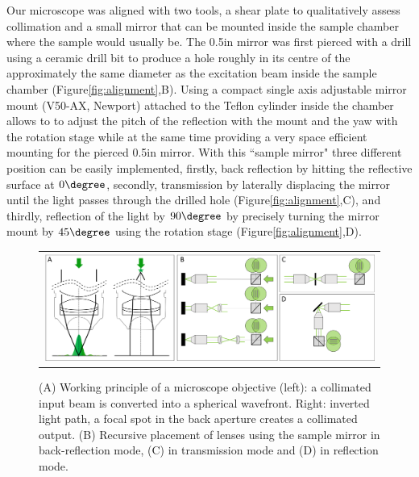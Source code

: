 \documentclass[12pt]{spieman}  %
\begin{document}
Our microscope was aligned with two tools, a shear plate to qualitatively assess collimation and a small mirror that can be mounted inside the sample chamber where the sample would usually be. The 0.5in mirror was first pierced with a drill using a ceramic drill bit to produce a hole roughly in its centre of the approximately the same diameter as the excitation beam inside the sample chamber (Figure\ref{fig:alignment},B). Using a compact single axis adjustable mirror mount (V50-AX, Newport) attached to the Teflon cylinder inside the chamber allows to to adjust the pitch of the reflection with the mount and the yaw with the rotation stage while at the same time providing a very space efficient mounting for the pierced 0.5in mirror. With this ``sample mirror" three different position can be easily implemented, firstly, back reflection by hitting the reflective surface at $0\degree$, secondly, transmission by laterally displacing the mirror until the light passes through the drilled hole (Figure\ref{fig:alignment},C), and thirdly, reflection of the light by $90\degree$ by precisely turning the mirror mount by $45\degree$ using the rotation stage (Figure\ref{fig:alignment},D). 

\begin{figure}
   \begin{center}
   \begin{tabular}{c}
   \includegraphics[width=\textwidth]{Panel4.eps}
   \end{tabular}
   \end{center}
   \caption{\label{fig:alignment2} (A) Working principle of a microscope objective (left): a collimated input beam is converted into a spherical wavefront. Right: inverted light path, a focal spot in the back aperture creates a collimated output. (B) Recursive placement of lenses using the sample mirror in back-reflection mode, (C) in transmission mode and (D) in reflection mode.} 
   \end{figure}
\end{document}
